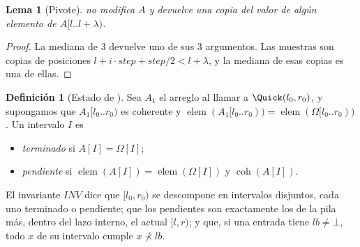 \documentclass[10pt,a4paper]{article}
\theoremstyle{plain}
\newtheorem{lema}[teorema]{Lema}
\theoremstyle{definition}
\newtheorem{definicion}[teorema]{Definición}
\theoremstyle{remark}
\newcommand{\nlt}{\not\prec}
\newcommand{\elems}{\operatorname{elem}}
\newcommand{\coh}{\operatorname{coh}}
\begin{document}
\begin{lema}[Pivote]\label{lem:pivote}
\Pivote no modifica $A$ y devuelve una copia del valor de algún elemento de
$A[l..l{+}\lambda)$.
\end{lema}
\begin{proof}
La mediana de 3 devuelve uno de sus 3 argumentos. Las muestras son copias de
posiciones $l+i\cdot\mathit{step}+\mathit{step}/2<l+\lambda$, y la mediana de esas
copias es una de ellas.
\end{proof}

\begin{definicion}[Estado de \Quick]\label{def:invq}
Sea $A_1$ el arreglo al llamar a $\Quick(l_0,r_0)$, y supongamos que $A_1[l_0..r_0)$
es coherente y $\elems(A_1[l_0..r_0))=\elems(\Omega[l_0..r_0))$. Un intervalo $I$ es
\begin{itemize}[nosep]
\item \emph{terminado} si $A[I]=\Omega[I]$;
\item \emph{pendiente} si $\elems(A[I])=\elems(\Omega[I])$ y $\coh(A[I])$.
\end{itemize}
El invariante $\mathit{INV}$ dice que $[l_0,r_0)$ se descompone en intervalos
disjuntos, cada uno terminado o pendiente; que los pendientes son exactamente los de
la pila más, dentro del lazo interno, el actual $[l,r)$; y que, si una entrada tiene
$\mathit{lb}\ne\bot$, todo $x$ de su intervalo cumple $x\nlt\mathit{lb}$.
\end{definicion}
\end{document}
